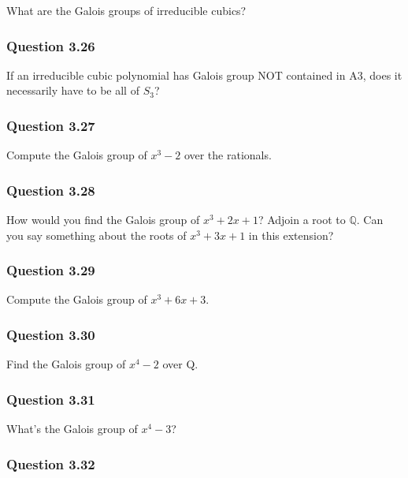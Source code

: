 What are the Galois groups of irreducible cubics?

\hypertarget{question-3.26}{%
\subsubsection{Question 3.26}\label{question-3.26}}

If an irreducible cubic polynomial has Galois group NOT contained in A3,
does it necessarily have to be all of \(S_3\)?

\hypertarget{question-3.27}{%
\subsubsection{Question 3.27}\label{question-3.27}}

Compute the Galois group of \(x^3 - 2\) over the rationals.

\hypertarget{question-3.28}{%
\subsubsection{Question 3.28}\label{question-3.28}}

How would you find the Galois group of \(x^3 + 2x + 1\)? Adjoin a root
to \({\mathbb{Q}}\). Can you say something about the roots of
\(x^3 + 3x + 1\) in this extension?

\hypertarget{question-3.29}{%
\subsubsection{Question 3.29}\label{question-3.29}}

Compute the Galois group of \(x^3 + 6x + 3\).

\hypertarget{question-3.30}{%
\subsubsection{Question 3.30}\label{question-3.30}}

Find the Galois group of \(x^4 - 2\) over Q.

\hypertarget{question-3.31}{%
\subsubsection{Question 3.31}\label{question-3.31}}

What's the Galois group of \(x^4 - 3\)?

\hypertarget{question-3.32}{%
\subsubsection{Question 3.32}\label{question-3.32}}

